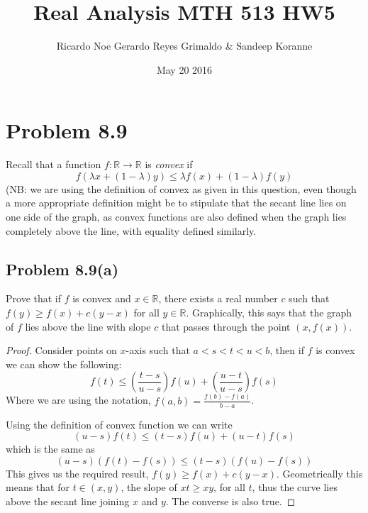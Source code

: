 \documentclass{article}[12pt]
\newtheorem{proof}{Proof}
\def\RR{\mathbb R}
\begin{document}
\title{Real Analysis MTH 513 HW5}
\date{May 20 2016}
\author{ Ricardo Noe Gerardo Reyes Grimaldo \& Sandeep Koranne}
\maketitle
\section*{Problem 8.9}
Recall that a function $f:\RR\to \RR$ is \emph{convex} if
\[
f(\lambda x+(1-\lambda)y) \le \lambda f(x) + (1-\lambda)f(y)
\]
(NB: we are using the definition of convex as given in this question,
even though a more appropriate definition might be to stipulate that
the secant line lies on one side of the graph, as convex functions
are also defined when the graph lies completely above the line, with equality
defined similarly.

\subsection*{Problem 8.9(a)}
Prove that if $f$ is convex and $x\in\RR$, there exists a real number $c$ such that
$f(y)\ge f(x)+c(y-x)$ for all $y\in \RR$. Graphically, this says that the graph of $f$
lies above the line with slope $c$ that passes through the point $(x,f(x))$.

\begin{proof}
Consider points on $x$-axis such that $a<s<t<u<b$, then if $f$ is convex we 
can show the following:
\[
f(t) \le \left(\frac{t-s}{u-s}\right)f(u) + \left(\frac{u-t}{u-s}\right)f(s)
\]
Where we are using the notation, $f(a,b)=\frac{f(b)-f(a)}{b-a}$.

Using the definition of convex function we can write 
\[
(u-s)f(t) \le (t-s)f(u) + (u-t)f(s)
\]
which is the same as
\[
(u-s)(f(t)-f(s))\le (t-s)(f(u)-f(s))
\]
This gives us the required result, $f(y)\ge f(x)+c(y-x)$.
Geometrically this means that for $t\in (x,y)$, the slope of $xt \ge xy$, for
all $t$, thus the curve lies above the secant line joining $x$ and $y$.
The converse is also true.  
\end{proof}
\end{document}
